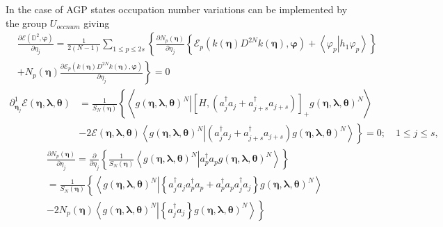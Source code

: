 \documentclass[aps,preprint]{revtex4}%
\begin{document}
In the case of AGP states occupation number variations can be implemented by
the group $U_{occnum}$ giving
\begin{align}
&  \frac{\partial\mathcal{E}\left(  \mathbb{D}^{2},\mathbf{\varphi}\right)
}{\partial\eta_{j}}=\frac{1}{2\left(  N-1\right)  }\sum_{1\leq p\leq
2s}\left\{  \frac{\partial N_{p}\left(  \mathbf{\eta}\right)  }{\partial
\eta_{j}}\left\{  \mathcal{E}_{p}\left(  k\left(  \mathbf{\eta}\right)
D^{2N}k\left(  \mathbf{\eta}\right)  ,\mathbf{\varphi}\right)  +\left\langle
\left.  \varphi_{p}\right\vert h_{1}\varphi_{p}\right\rangle \right\}  \right.
\\
&  \left.  +\right.  \left.  N_{p}\left(  \mathbf{\eta}\right)  \frac
{\partial\mathcal{E}_{p}\left(  k\left(  \mathbf{\eta}\right)  D^{2N}k\left(
\mathbf{\eta}\right)  ,\mathbf{\varphi}\right)  }{\partial\eta_{j}}\right\}
=0
\end{align}%
\begin{align}
\partial_{\mathbf{\eta}_{j}}^{1}\mathcal{E}\left(  \mathbf{\eta}%
,\mathbf{\lambda},\mathbf{\theta}\right)   &  =\frac{1}{S_{N}\left(
\mathbf{\eta}\right)  }\left\{  \left\langle \left.  g\left(  \mathbf{\eta
},\mathbf{\lambda},\mathbf{\theta}\right)  ^{N}\right\vert \left[  H,\left(
a_{j}^{\dagger}a_{j}+a_{j+s}^{\dagger}a_{j+s}\right)  \right]  _{+}g\left(
\mathbf{\eta},\mathbf{\lambda},\mathbf{\theta}\right)  ^{N}\right\rangle
\right. \nonumber\\
&  -\left.  2\mathcal{E}\left(  \mathbf{\eta},\mathbf{\lambda},\mathbf{\theta
}\right)  \left\langle \left.  g\left(  \mathbf{\eta},\mathbf{\lambda
},\mathbf{\theta}\right)  ^{N}\right\vert \left(  a_{j}^{\dagger}a_{j}%
+a_{j+s}^{\dagger}a_{j+s}\right)  g\left(  \mathbf{\eta},\mathbf{\lambda
},\mathbf{\theta}\right)  ^{N}\right\rangle \right\}  =0;\quad1\leq j\leq s,
\end{align}%
\begin{align}
&  \frac{\partial N_{p}\left(  \mathbf{\eta}\right)  }{\partial\eta_{j}}%
=\frac{\partial}{\partial\eta_{j}}\left\{  \frac{1}{S_{N}\left(  \mathbf{\eta
}\right)  }\left\langle \left.  g\left(  \mathbf{\eta},\mathbf{\lambda
},\mathbf{\theta}\right)  ^{N}\right\vert a_{p}^{\dagger}a_{p}g\left(
\mathbf{\eta},\mathbf{\lambda},\mathbf{\theta}\right)  ^{N}\right\rangle
\right\} \\
&  =\frac{1}{S_{N}\left(  \mathbf{\eta}\right)  }\left\{  \left\langle \left.
g\left(  \mathbf{\eta},\mathbf{\lambda},\mathbf{\theta}\right)  ^{N}%
\right\vert \left\{  a_{j}^{\dagger}a_{j}a_{p}^{\dagger}a_{p}+a_{p}^{\dagger
}a_{p}a_{j}^{\dagger}a_{j}\right\}  g\left(  \mathbf{\eta},\mathbf{\lambda
},\mathbf{\theta}\right)  ^{N}\right\rangle \right. \\
&  \left.  -2N_{p}\left(  \mathbf{\eta}\right)  \left\langle \left.  g\left(
\mathbf{\eta},\mathbf{\lambda},\mathbf{\theta}\right)  ^{N}\right\vert
\left\{  a_{j}^{\dagger}a_{j}\right\}  g\left(  \mathbf{\eta},\mathbf{\lambda
},\mathbf{\theta}\right)  ^{N}\right\rangle \right\}
\end{align}%
\end{document}

